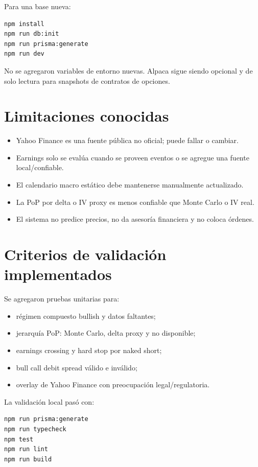 \documentclass[11pt,letterpaper]{article}
\begin{document}
Para una base nueva:

\begin{lstlisting}
npm install
npm run db:init
npm run prisma:generate
npm run dev
\end{lstlisting}

No se agregaron variables de entorno nuevas. Alpaca sigue siendo opcional y de
solo lectura para snapshots de contratos de opciones.

\section{Limitaciones conocidas}

\begin{itemize}[noitemsep]
  \item Yahoo Finance es una fuente p\'ublica no oficial; puede fallar o cambiar.
  \item Earnings solo se eval\'ua cuando se proveen eventos o se agregue una fuente
        local/confiable.
  \item El calendario macro est\'atico debe mantenerse manualmente actualizado.
  \item La PoP por delta o IV proxy es menos confiable que Monte Carlo o IV real.
  \item El sistema no predice precios, no da asesor\'ia financiera y no coloca
        \'ordenes.
\end{itemize}

\section{Criterios de validaci\'on implementados}

Se agregaron pruebas unitarias para:

\begin{itemize}[noitemsep]
  \item r\'egimen compuesto bullish y datos faltantes;
  \item jerarqu\'ia PoP: Monte Carlo, delta proxy y no disponible;
  \item earnings crossing y hard stop por naked short;
  \item bull call debit spread v\'alido e inv\'alido;
  \item overlay de Yahoo Finance con preocupaci\'on legal/regulatoria.
\end{itemize}

La validaci\'on local pas\'o con:

\begin{lstlisting}
npm run prisma:generate
npm run typecheck
npm test
npm run lint
npm run build
\end{lstlisting}
\end{document}
